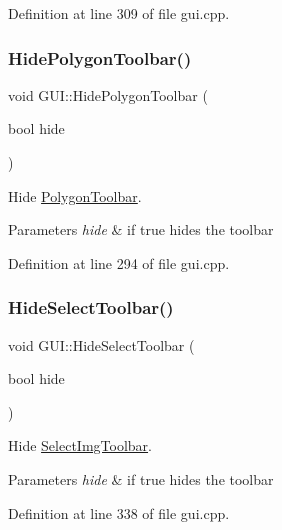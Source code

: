 Definition at line 309 of file gui.\+cpp.

\mbox{\label{classGUI_aaf633cd0904e4c3627c21219f330c177}} 
\subsubsection{\texorpdfstring{Hide\+Polygon\+Toolbar()}{HidePolygonToolbar()}}
{\footnotesize\ttfamily void G\+U\+I\+::\+Hide\+Polygon\+Toolbar (\begin{DoxyParamCaption}\item[{bool}]{hide }\end{DoxyParamCaption})}



Hide \mbox{\hyperlink{structPolygonToolbar}{Polygon\+Toolbar}}. 


\begin{DoxyParams}{Parameters}
{\em hide} & if true hides the toolbar \\
\hline
\end{DoxyParams}


Definition at line 294 of file gui.\+cpp.

\mbox{\label{classGUI_a7f6d3b1fcbd874fccd93c5f29c468ed8}} 
\subsubsection{\texorpdfstring{Hide\+Select\+Toolbar()}{HideSelectToolbar()}}
{\footnotesize\ttfamily void G\+U\+I\+::\+Hide\+Select\+Toolbar (\begin{DoxyParamCaption}\item[{bool}]{hide }\end{DoxyParamCaption})}



Hide \mbox{\hyperlink{structSelectImgToolbar}{Select\+Img\+Toolbar}}. 


\begin{DoxyParams}{Parameters}
{\em hide} & if true hides the toolbar \\
\hline
\end{DoxyParams}


Definition at line 338 of file gui.\+cpp.

